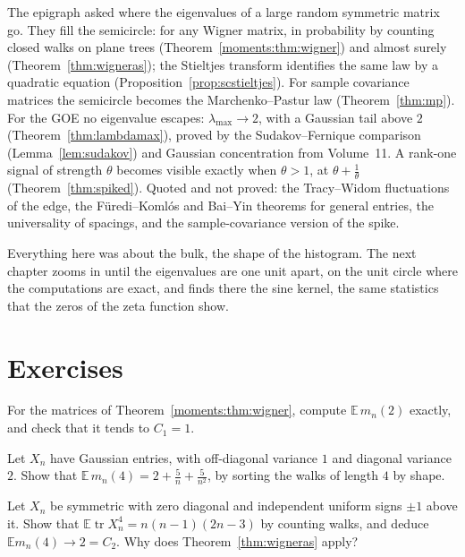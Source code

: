 The epigraph asked where the eigenvalues of a large random symmetric matrix go. They fill the semicircle: for any Wigner matrix, in probability by counting closed walks on plane trees (Theorem~\ref{moments:thm:wigner}) and almost surely (Theorem~\ref{thm:wigneras}); the Stieltjes transform identifies the same law by a quadratic equation (Proposition~\ref{prop:scstieltjes}). For sample covariance matrices the semicircle becomes the Marchenko--Pastur law (Theorem~\ref{thm:mp}). For the GOE no eigenvalue escapes: $\lambda_{\max}\to2$, with a Gaussian tail above $2$ (Theorem~\ref{thm:lambdamax}), proved by the Sudakov--Fernique comparison (Lemma~\ref{lem:sudakov}) and Gaussian concentration from Volume~11. A rank-one signal of strength $\theta$ becomes visible exactly when $\theta>1$, at $\theta+\frac1\theta$ (Theorem~\ref{thm:spiked}). Quoted and not proved: the Tracy--Widom fluctuations of the edge, the F\"uredi--Koml\'os and Bai--Yin theorems for general entries, the universality of spacings, and the sample-covariance version of the spike.

Everything here was about the bulk, the shape of the histogram. The next chapter zooms in until the eigenvalues are one unit apart, on the unit circle where the computations are exact, and finds there the sine kernel, the same statistics that the zeros of the zeta function show.

\section{Exercises}
\begin{exercise}[$\star$]\label{moments:ex:trace2}
For the matrices of Theorem~\ref{moments:thm:wigner}, compute $\mathbb E\,m_n(2)$ exactly, and check that it tends to $C_1=1$.
\end{exercise}
\begin{exercise}[$\star\star$]\label{moments:ex:trace4}
Let $X_n$ have Gaussian entries, with off-diagonal variance $1$ and diagonal variance $2$. Show that $\mathbb E\,m_n(4)=2+\frac5n+\frac5{n^2}$, by sorting the walks of
length $4$ by shape.
\end{exercise}

\begin{exercise}[$\star$]\label{ex:pmone}
Let $X_n$ be symmetric with zero diagonal and independent uniform signs $\pm1$ above it. Show that $\mathbb E\operatorname{tr}X_n^4=n(n-1)(2n-3)$ by counting walks, and deduce $\mathbb Em_n(4)\to2=C_2$. Why does Theorem~\ref{thm:wigneras} apply?
\end{exercise}

